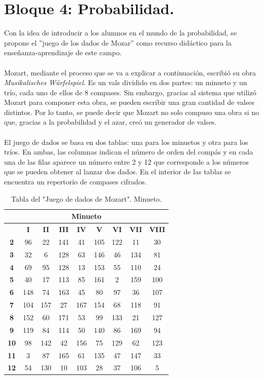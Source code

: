 \documentclass[a4paper, openright, 11pt, titlepage]{report}
\theoremstyle{definition}\newtheorem{defin}[propo]{Definition}
\theoremstyle{definition}\newtheorem{obser}[propo]{Remark}
\theoremstyle{definition}\newtheorem{ejem}[propo]{Ejemplo}
\theoremstyle{definition}\newtheorem{algoritmo}[propo]{Algoritmo}
\begin{document}
\section{Bloque 4: Probabilidad.}
Con la idea de introducir a los alumnos en el mundo de la probabilidad, se propone el ''juego de los dados de Mozar'' como recurso didáctico para la enseñanza-aprendizaje de este campo.\\\\
Mozart, mediante el proceso que se va a explicar a continuación, escribió su obra \textit{Musikalisches Würfelspiel}. Es un vals dividido en dos partes: un minueto y un trío, cada uno de ellos de 8 compases. Sin embargo, gracias al sistema que utilizó Mozart para componer esta obra, se pueden escribir una gran cantidad de valses distintos. Por lo tanto, se puede decir que Mozart no solo compuso una obra si no que, gracias a la probabilidad y el azar, creó un generador de valses.\\\\
El juego de dados se basa en dos tablas: una para los minuetos y otra para los tríos. En ambas, las columnas indican el número de orden del compás y en cada una
de las filas aparece un número entre 2 y 12 que corresponde a los números que se pueden obtener al lanzar dos dados.
En el interior de las tablas se encuentra un repertorio de compases cifrados.
\begin{table}[H]
    \centering
    \begin{tabular}{|c|c|c|c|c|c|c|c|c|}
    \hline
    \multicolumn{9}{|c|}{Minueto}\\
    \hline \hline 
         & \textbf{I} & \textbf{II} & \textbf{III} & \textbf{IV} & \textbf{V} & \textbf{VI} & \textbf{VII} & \textbf{VIII}\\
         \hline
         \textbf{2} & 96 & 22 & 141 & 41 & 105 & 122 & 11 & 30\\
         \hline
         \textbf{3} & 32 & 6 & 128 & 63 & 146 & 46 & 134 & 81\\
         \hline
         \textbf{4} & 69 & 95 & 128 & 13 & 153 & 55 & 110 & 24\\
         \hline
         \textbf{5} & 40 & 17 & 113 & 85 & 161 & 2 & 159 & 100\\
         \hline
         \textbf{6} & 148 & 74 & 163 & 45 & 80 & 97 & 36 & 107\\
         \hline
         \textbf{7} & 104 & 157 & 27 & 167 & 154 & 68 & 118 & 91\\
         \hline
         \textbf{8} & 152 & 60 & 171 & 53 & 99 & 133 & 21 & 127\\
         \hline
         \textbf{9} & 119 & 84 & 114 & 50 & 140 & 86 & 169 & 94\\
         \hline
         \textbf{10} & 98 & 142 & 42 & 156 & 75 & 129 & 62 & 123\\
         \hline
         \textbf{11} & 3 & 87 & 165 & 61 & 135 & 47 & 147 & 33\\
         \hline
         \textbf{12} & 54 & 130 & 10 & 103 & 28 & 37 & 106 & 5\\
         \hline
    \end{tabular}
    \caption{Tabla del "Juego de dados de Mozart". Minueto.}
\end{table}
\end{document}
